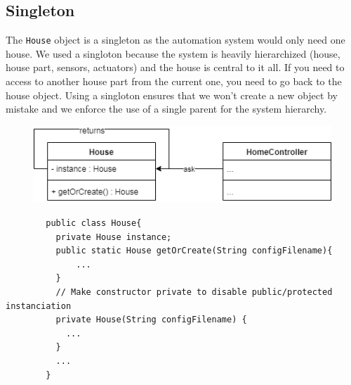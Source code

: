       \subsection{Singleton}
        The \texttt{House} object is a singleton as the automation system would only need one house. We used a singloton because the system is heavily hierarchized (house, house part, sensors, actuators) and the house is central to it all. If you need to access to another house part from the current one, you need to go back to the house object. Using a singloton ensures that we won't create a new object by mistake and we enforce the use of a single parent for the system hierarchy.

        \begin{figure}[!h]
          \includegraphics[scale=0.75]{singletonhouse.png}
        \end{figure}

        \begin{verbatim}
        public class House{
          private House instance;
          public static House getOrCreate(String configFilename){
              ...
          }
          // Make constructor private to disable public/protected instanciation
          private House(String configFilename) {
            ...
          }
          ...
        }
        \end{verbatim}

